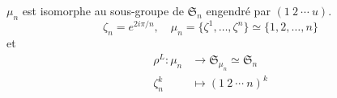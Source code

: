 \begin{example}
    \(\mu_n\) est isomorphe au sous-groupe de \({\mathfrak{S}}_n\) engendré par \((1~2~\cdots~u)\).
    \begin{equation*}
        \zeta_n = e^{2i\pi/n}, \quad \mu_n = \{\zeta^1,\ldots,\zeta^{n}\} \simeq \{1,2,\ldots,n\}
    \end{equation*}
    et
    \begin{equation*}
        \begin{aligned}
            \rho^L : \mu_n &\to {\mathfrak{S}}_{\mu_n} \simeq {\mathfrak{S}}_{n}\\
            \zeta_n^k &\mapsto {(1~2~\cdots~n)}^k
        \end{aligned}
    \end{equation*}
\end{example}

